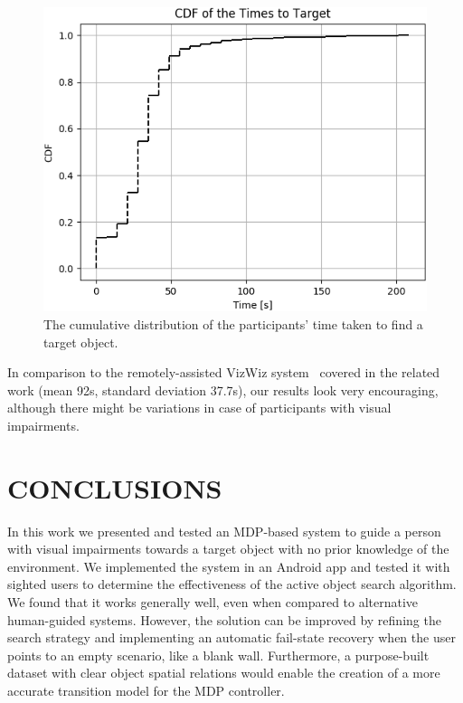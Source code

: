 \documentclass[a4paper, twoside]{article}
\begin{document}
\begin{figure}
  \centering
  \includegraphics[width=\columnwidth]{../figures/cdf_total_time.png}
  \caption{The cumulative distribution of the participants' time taken to find a target object. }\label{fig:time-participants}
\end{figure}

In comparison to the remotely-assisted VizWiz system~\cite{bigham2010vizwiz} covered in the related work (mean 92s, standard deviation 37.7s), our results look very encouraging, although there might be variations in case of participants with visual impairments.

\section{\uppercase{Conclusions}}\label{sec:conclusion}

\noindent In this work we presented and tested an MDP-based system to guide a person with visual impairments towards a target object with no prior knowledge of the environment. We implemented the system in an Android app and tested it with sighted users to determine the effectiveness of the active object search algorithm. We found that it works generally well, even when compared to alternative human-guided systems. However, the solution can be improved by refining the search strategy and implementing an automatic fail-state recovery when the user points to an empty scenario, like a blank wall. Furthermore, a purpose-built dataset with clear object spatial relations would enable the creation of a more accurate transition model for the MDP controller.
\end{document}
